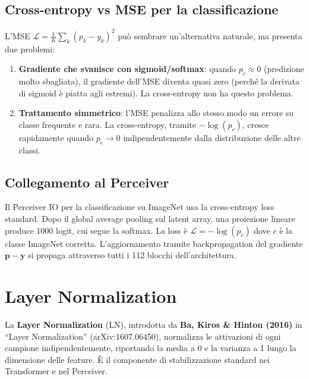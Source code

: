 \documentclass[
  11pt,
]{article}
\begin{document}
\subsection{Cross-entropy vs MSE per la classificazione}

\begin{notabox}[title={\textbf{Perché non usare l'MSE per la classificazione?}}]
L'MSE $\mathcal{L} = \frac{1}{K}\sum_k (p_k - y_k)^2$ può sembrare un'alternativa naturale, ma presenta due problemi:
\begin{enumerate}
  \item \textbf{Gradiente che svanisce con sigmoid/softmax}: quando $p_c \approx 0$ (predizione molto sbagliata), il gradiente dell'MSE diventa quasi zero (perché la derivata di sigmoid è piatta agli estremi). La cross-entropy non ha questo problema.
  \item \textbf{Trattamento simmetrico}: l'MSE penalizza allo stesso modo un errore su classe frequente e rara. La cross-entropy, tramite $-\log(p_c)$, cresce rapidamente quando $p_c \to 0$ indipendentemente dalla distribuzione delle altre classi.
\end{enumerate}
\end{notabox}

\subsection{Collegamento al Perceiver}

\begin{notabox}[title={\textbf{Cross-entropy nel Perceiver}}]
Il Perceiver IO per la classificazione su ImageNet usa la cross-entropy loss standard. Dopo il global average pooling sul latent array, una proiezione lineare produce 1000 logit, cui segue la softmax. La loss è $\mathcal{L} = -\log(p_c)$ dove $c$ è la classe ImageNet corretta. L'aggiornamento tramite backpropagation del gradiente $\mathbf{p} - \mathbf{y}$ si propaga attraverso tutti i 112 blocchi dell'architettura.
\end{notabox}

\section{Layer Normalization}
\label{app:layernorm}

La \textbf{Layer Normalization} (LN), introdotta da \textbf{Ba, Kiros \& Hinton (2016)} in ``Layer Normalization'' (arXiv:1607.06450), normalizza le attivazioni di ogni campione indipendentemente, riportando la media a 0 e la varianza a 1 lungo la dimensione delle feature. È il componente di stabilizzazione standard nei Transformer e nel Perceiver.
\end{document}
